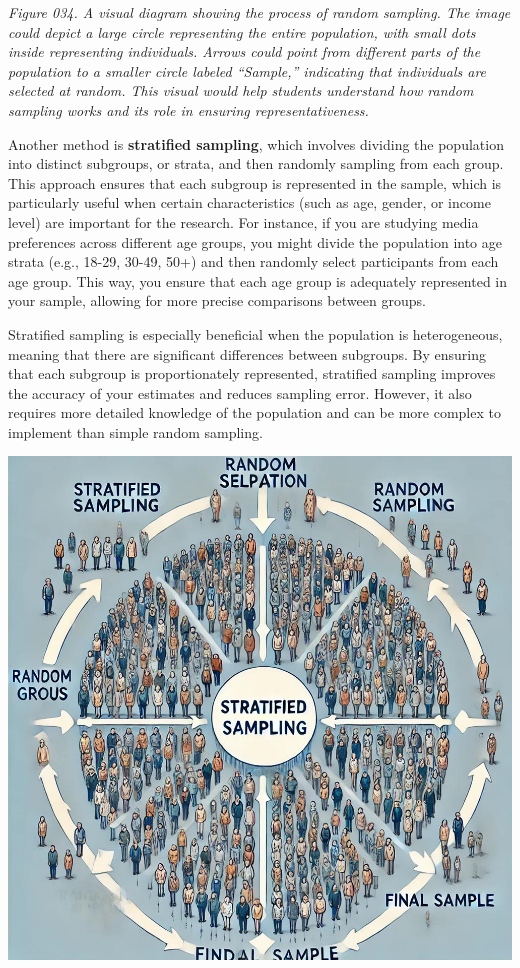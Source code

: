 \documentclass[
]{book}
\begin{document}
\emph{Figure 034. A visual diagram showing the process of random sampling. The image could depict a large circle representing the entire population, with small dots inside representing individuals. Arrows could point from different parts of the population to a smaller circle labeled ``Sample,'' indicating that individuals are selected at random. This visual would help students understand how random sampling works and its role in ensuring representativeness.}

Another method is \textbf{stratified sampling}, which involves dividing the population into distinct subgroups, or strata, and then randomly sampling from each group. This approach ensures that each subgroup is represented in the sample, which is particularly useful when certain characteristics (such as age, gender, or income level) are important for the research. For instance, if you are studying media preferences across different age groups, you might divide the population into age strata (e.g., 18-29, 30-49, 50+) and then randomly select participants from each age group. This way, you ensure that each age group is adequately represented in your sample, allowing for more precise comparisons between groups.

Stratified sampling is especially beneficial when the population is heterogeneous, meaning that there are significant differences between subgroups. By ensuring that each subgroup is proportionately represented, stratified sampling improves the accuracy of your estimates and reduces sampling error. However, it also requires more detailed knowledge of the population and can be more complex to implement than simple random sampling.

\includegraphics[width=1\textwidth,height=\textheight]{images/fig035.jpg}
\end{document}
